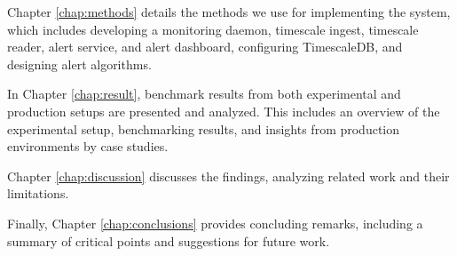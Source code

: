 Chapter \ref{chap:methods} details the methods we use for implementing the system, which includes developing a monitoring daemon, timescale ingest, timescale reader, alert service, and alert dashboard, configuring TimescaleDB, and designing alert algorithms.

In Chapter \ref{chap:result}, benchmark results from both experimental and production setups are presented and analyzed. This includes an overview of the experimental setup, benchmarking results, and insights from production environments by case studies.

Chapter \ref{chap:discussion} discusses the findings, analyzing related work and their limitations.

Finally, Chapter \ref{chap:conclusions} provides concluding remarks, including a summary of critical points and suggestions for future work.
